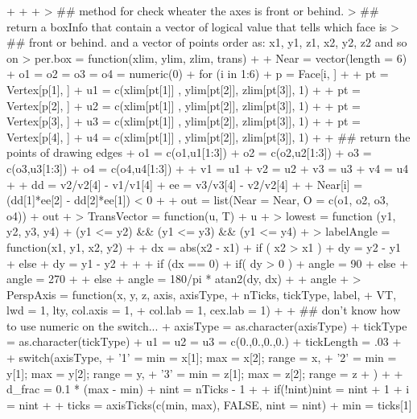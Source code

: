 \documentclass[paper=a4, fontsize=11pt]{report}
\begin{document}
\begin{Schunk}
\begin{Sinput}
{+ 
+ 
+ }
> ## method for check wheater the axes is front or behind.
> ## return a boxInfo that contain a vector of logical value that tells which face is
> ## front or behind. and a vector of points order as: x1, y1, z1, x2, y2, z2 and so on 
> per.box = function(xlim, ylim, zlim, trans){
+         
+     Near = vector(length = 6)
+     o1 = o2 = o3 = o4 = numeric(0)
+     for (i in 1:6) {
+         p = Face[i, ]
+ 
+         pt = Vertex[p[1], ]
+         u1 = c(xlim[pt[1]] , ylim[pt[2]], zlim[pt[3]], 1)
+ 
+         pt = Vertex[p[2], ]
+         u2 = c(xlim[pt[1]] , ylim[pt[2]], zlim[pt[3]], 1)
+ 
+         pt = Vertex[p[3], ]
+         u3 = c(xlim[pt[1]] , ylim[pt[2]], zlim[pt[3]], 1)
+ 
+         pt = Vertex[p[4], ]
+         u4 = c(xlim[pt[1]] , ylim[pt[2]], zlim[pt[3]], 1)
+ 
+         ## return the points of drawing edges
+         o1 = c(o1,u1[1:3])
+         o2 = c(o2,u2[1:3])
+         o3 = c(o3,u3[1:3])
+         o4 = c(o4,u4[1:3])
+ 
+         v1 = u1 %
+         v2 = u2 %
+         v3 = u3 %
+         v4 = u4 %
+ 
+         dd = v2/v2[4] - v1/v1[4]
+         ee = v3/v3[4] - v2/v2[4]
+ 
+         Near[i] = (dd[1]*ee[2] - dd[2]*ee[1]) < 0
+     }
+     out = list(Near = Near, O = c(o1, o2, o3, o4))
+     out
+ }
> TransVector = function(u, T) {
+     u %
+ }
> lowest = function (y1, y2, y3, y4) {
+     (y1 <= y2) && (y1 <= y3) && (y1 <= y4)		
+ }
> labelAngle = function(x1, y1, x2, y2){  
+ 
+     dx = abs(x2 - x1)
+     if ( x2 > x1 ) {
+         dy = y2 - y1
+     } else {
+         dy = y1 - y2
+     }
+     
+     if (dx == 0) {
+         if( dy > 0 ) {
+             angle = 90
+         } else {
+             angle = 270
+         }
+     } else {
+         angle = 180/pi * atan2(dy, dx)
+     }
+     angle
+ }	
> PerspAxis = function(x, y, z, axis, axisType, 
+                     nTicks, tickType, label, 
+                     VT, lwd = 1, lty, col.axis = 1,
+                     col.lab = 1, cex.lab = 1){
+ 
+     ## don't know how to use numeric on the switch...
+     axisType = as.character(axisType)
+     tickType = as.character(tickType)
+     u1 = u2 = u3 = c(0.,0.,0.,0.)
+     tickLength = .03
+ 
+     switch(axisType,
+            '1' = {min = x[1]; max = x[2]; range = x},
+            '2' = {min = y[1]; max = y[2]; range = y},
+            '3' = {min = z[1]; max = z[2]; range = z}
+             )
+             
+     d_frac = 0.1 * (max - min)
+     nint = nTicks - 1
+     
+     if(!nint)nint = nint + 1
+     i = nint
+ 
+     ticks = axisTicks(c(min, max), FALSE, nint = nint)
+     min = ticks[1]
}
\end{Sinput}
\end{Schunk}
\end{document}
